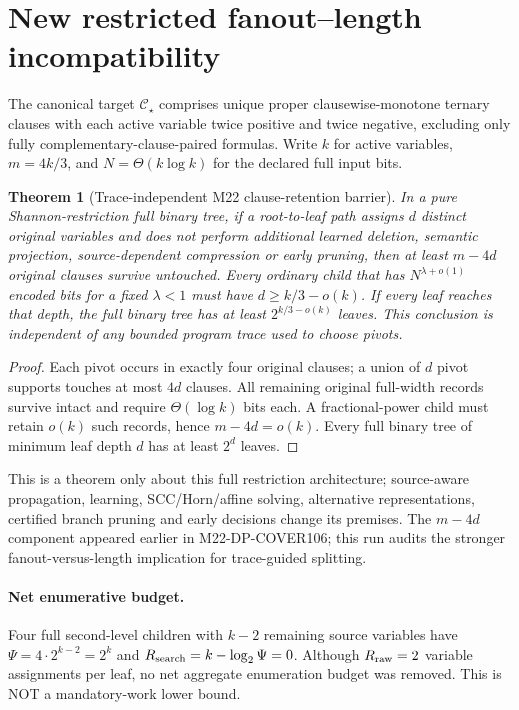 \documentclass[11pt]{article}
\newtheorem{theorem}{Theorem}
\begin{document}
\section{New restricted fanout--length incompatibility}
The canonical target $\mathcal C_\star$ comprises unique proper clausewise-monotone ternary clauses with each active variable twice positive and twice negative, excluding only fully complementary-clause-paired formulas. Write $k$ for active variables, $m=4k/3$, and $N=\Theta(k\log k)$ for the declared full input bits.
\begin{theorem}[Trace-independent M22 clause-retention barrier]
In a pure Shannon-restriction full binary tree, if a root-to-leaf path assigns $d$ distinct original variables and does not perform additional learned deletion, semantic projection, source-dependent compression or early pruning, then at least $m-4d$ original clauses survive untouched. Every ordinary child that has $N^{\lambda+o(1)}$ encoded bits for a fixed $\lambda<1$ must have $d\ge k/3-o(k)$. If every leaf reaches that depth, the full binary tree has at least $2^{k/3-o(k)}$ leaves. This conclusion is independent of any bounded program trace used to choose pivots.
\end{theorem}
\begin{proof}Each pivot occurs in exactly four original clauses; a union of $d$ pivot supports touches at most $4d$ clauses. All remaining original full-width records survive intact and require $\Theta(\log k)$ bits each. A fractional-power child must retain $o(k)$ such records, hence $m-4d=o(k)$. Every full binary tree of minimum leaf depth $d$ has at least $2^d$ leaves.\end{proof}
This is a theorem only about this full restriction architecture; source-aware propagation, learning, SCC/Horn/affine solving, alternative representations, certified branch pruning and early decisions change its premises. The $m-4d$ component appeared earlier in M22-DP-COVER106; this run audits the stronger fanout-versus-length implication for trace-guided splitting.
\paragraph{Net enumerative budget.} Four full second-level children with $k-2$ remaining source variables have $\Psi=4\cdot2^{k-2}=2^k$ and $R_{\rm search}=k-\log_2\Psi=0$. Although $R_{\rm raw}=2$ variable assignments per leaf, no net aggregate enumeration budget was removed. This is NOT a mandatory-work lower bound.
\end{document}
